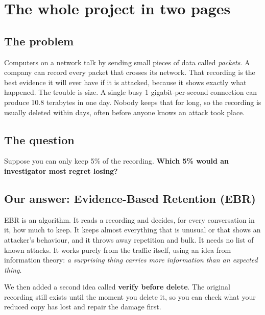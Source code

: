 \chapter{The whole project in two pages}

\section{The problem}
Computers on a network talk by sending small pieces of data called \emph{packets}. A company can record every packet that crosses its network. That recording is the best evidence it will ever have if it is attacked, because it shows exactly what happened. The trouble is size. A single busy 1 gigabit-per-second connection can produce 10.8 terabytes in one day. Nobody keeps that for long, so the recording is usually deleted within days, often before anyone knows an attack took place.

\section{The question}
Suppose you can only keep 5\% of the recording. \textbf{Which 5\% would an investigator most regret losing?}

\section{Our answer: Evidence-Based Retention (EBR)}
EBR is an algorithm. It reads a recording and decides, for every conversation in it, how much to keep. It keeps almost everything that is unusual or that shows an attacker's behaviour, and it throws away repetition and bulk. It needs no list of known attacks. It works purely from the traffic itself, using an idea from information theory: \emph{a surprising thing carries more information than an expected thing}.

We then added a second idea called \textbf{verify before delete}. The original recording still exists until the moment you delete it, so you can check what your reduced copy has lost and repair the damage first.

